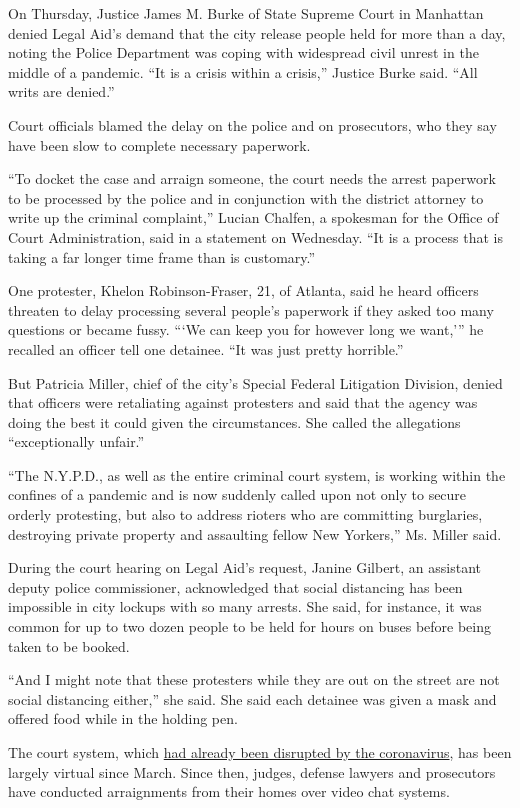 On Thursday, Justice James M. Burke of State Supreme Court in Manhattan
denied Legal Aid's demand that the city release people held for more
than a day, noting the Police Department was coping with widespread
civil unrest in the middle of a pandemic. ``It is a crisis within a
crisis,'' Justice Burke said. ``All writs are denied.''

Court officials blamed the delay on the police and on prosecutors, who
they say have been slow to complete necessary paperwork.

``To docket the case and arraign someone, the court needs the arrest
paperwork to be processed by the police and in conjunction with the
district attorney to write up the criminal complaint,'' Lucian Chalfen,
a spokesman for the Office of Court Administration, said in a statement
on Wednesday. ``It is a process that is taking a far longer time frame
than is customary.''

One protester, Khelon Robinson-Fraser, 21, of Atlanta, said he heard
officers threaten to delay processing several people's paperwork if they
asked too many questions or became fussy. ```We can keep you for however
long we want,''' he recalled an officer tell one detainee. ``It was just
pretty horrible.''

But Patricia Miller, chief of the city's Special Federal Litigation
Division, denied that officers were retaliating against protesters and
said that the agency was doing the best it could given the
circumstances. She called the allegations ``exceptionally unfair.''

``The N.Y.P.D., as well as the entire criminal court system, is working
within the confines of a pandemic and is now suddenly called upon not
only to secure orderly protesting, but also to address rioters who are
committing burglaries, destroying private property and assaulting fellow
New Yorkers,'' Ms. Miller said.

During the court hearing on Legal Aid's request, Janine Gilbert, an
assistant deputy police commissioner, acknowledged that social
distancing has been impossible in city lockups with so many arrests. She
said, for instance, it was common for up to two dozen people to be held
for hours on buses before being taken to be booked.

``And I might note that these protesters while they are out on the
street are not social distancing either,'' she said. She said each
detainee was given a mask and offered food while in the holding pen.

The court system, which
\href{https://www.nytimes3xbfgragh.onion/2020/03/20/nyregion/coronavirus-new-york-courts.html}{had
already been disrupted by the coronavirus}, has been largely virtual
since March. Since then, judges, defense lawyers and prosecutors have
conducted arraignments from their homes over video chat systems.

